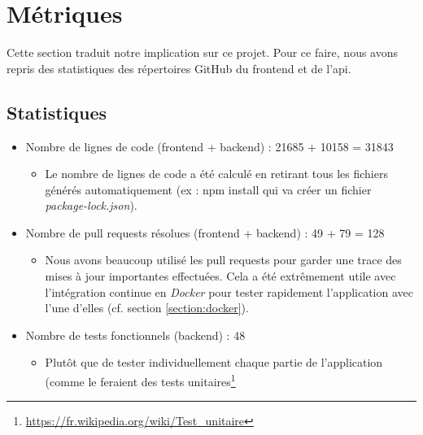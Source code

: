 \section{Métriques}
\label{section:codeMetrics}

Cette section traduit notre implication sur ce projet. 
Pour ce faire, nous avons repris des statistiques des répertoires GitHub du \gls{frontend} et de l'\gls{api}. 

\subsection{Statistiques}

\begin{itemize}[nosep,noitemsep,topsep=0pt,partopsep=0pt,after=\vspace*{2pt}]
    \item Nombre de lignes de code (\gls{frontend} + \gls{backend}) : 21685 + 10158 = 31843
    \begin{itemize}[nosep,noitemsep,topsep=0pt,partopsep=0pt,after=\vspace*{2pt}]
        \item Le nombre de lignes de code a été calculé en retirant tous les fichiers générés automatiquement (ex : npm install qui va créer un fichier \textit{package-lock.json}).
    \end{itemize}
    \item Nombre de pull requests résolues (\gls{frontend} + \gls{backend}) : 49 + 79 = 128
    \begin{itemize}[nosep,noitemsep,topsep=0pt,partopsep=0pt,after=\vspace*{2pt}]
        \item Nous avons beaucoup utilisé les pull requests pour garder une trace des mises à jour importantes effectuées. Cela a été extrêmement utile avec l'intégration continue en \textit{Docker} pour tester rapidement l'application avec l'une d'elles (cf. section \ref{section:docker}).
    \end{itemize}
    \item Nombre de tests fonctionnels (\gls{backend}) : 48
    \begin{itemize}[nosep,noitemsep,topsep=0pt,partopsep=0pt,after=\vspace*{2pt}]
        \item Plutôt que de tester individuellement chaque partie de l'application (comme le feraient des tests 
        unitaires\footnote{
            \href{https://fr.wikipedia.org/wiki/Test\_unitaire}{https://fr.wikipedia.org/wiki/Test\_unitaire}
}
\end{itemize}
\end{itemize}
